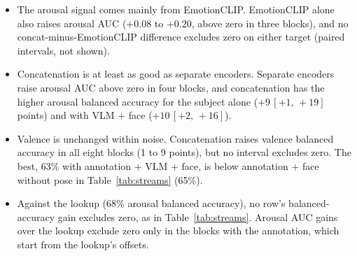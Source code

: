 \documentclass[11pt]{article}
\newcommand{\ci}[2]{\,[#1,\,#2]}
\begin{document}
\begin{table}[!htbp]
{\begin{itemize}
  \item The arousal signal comes mainly from EmotionCLIP. EmotionCLIP alone also raises arousal AUC ($+0.08$ to $+0.20$, above zero in three blocks), and no concat-minus-EmotionCLIP difference excludes zero on either target (paired intervals, not shown).
  \item Concatenation is at least as good as separate encoders. Separate encoders raise arousal AUC above zero in four blocks, and concatenation has the higher arousal balanced accuracy for the subject alone ($+9\ci{+1}{+19}$ points) and with VLM + face ($+10\ci{+2}{+16}$).
  \item Valence is unchanged within noise. Concatenation raises valence balanced accuracy in all eight blocks (1 to 9 points), but no interval excludes zero. The best, 63\% with annotation + VLM + face, is below annotation + face without pose in Table~\ref{tab:streams} (65\%).
  \item Against the lookup (68\% arousal balanced accuracy), no row's balanced-accuracy gain excludes zero, as in Table~\ref{tab:streams}. Arousal AUC gains over the lookup exclude zero only in the blocks with the annotation, which start from the lookup's offsets.
\end{itemize}}
\end{table}
\end{document}
